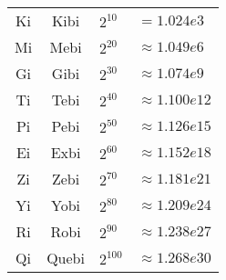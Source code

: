 \begin{sectionbox}
\begin{emphbox}
\begin{tabular}{ccll}
				Ki & Kibi  & $2^{10}$  & $= 1.024e3$ \\
				Mi & Mebi  & $2^{20}$  & $≈ 1.049e6$ \\
				Gi & Gibi  & $2^{30}$  & $≈ 1.074e9$ \\
				Ti & Tebi  & $2^{40}$  & $≈ 1.100e12$ \\
				Pi & Pebi  & $2^{50}$  & $≈ 1.126e15$ \\
				Ei & Exbi  & $2^{60}$  & $≈ 1.152e18$ \\
				Zi & Zebi  & $2^{70}$  & $≈ 1.181e21$ \\
				Yi & Yobi  & $2^{80}$  & $≈ 1.209e24$ \\
				Ri & Robi  & $2^{90}$  & $≈ 1.238e27$ \\
				Qi & Quebi & $2^{100}$ & $≈ 1.268e30$ \\

			\end{tabular}
		\end{emphbox}
	\end{sectionbox}
